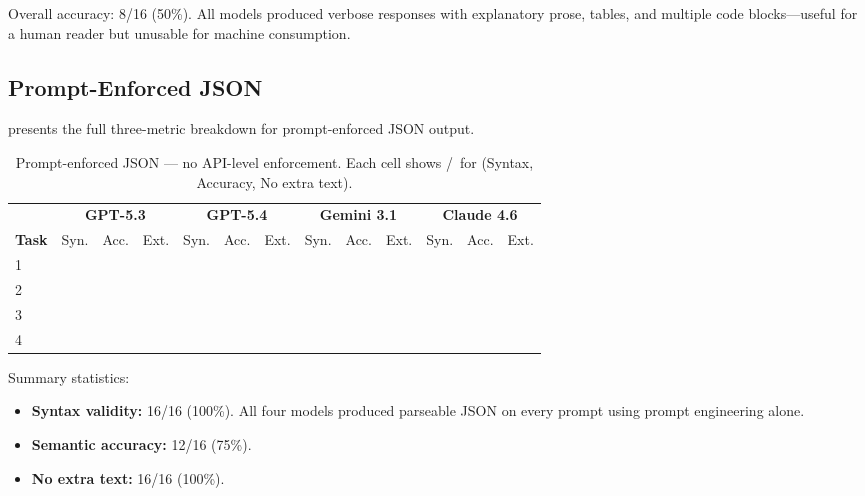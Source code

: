 \documentclass[11pt, letterpaper]{article}
\newcommand{\cmark}{\ding{51}}  %
\newcommand{\xmark}{\ding{55}}  %
\begin{document}
\noindent Overall accuracy: 8/16 (50\%). All models produced verbose responses with explanatory prose, tables, and multiple code blocks---useful for a human reader but unusable for machine consumption.

\subsection{Prompt-Enforced JSON}
\label{sec:prompt_results}

 presents the full three-metric breakdown for prompt-enforced JSON output.

\begin{table}[H]
\centering
\caption{Prompt-enforced JSON --- no API-level enforcement. Each cell shows \cmark/\xmark\ for (Syntax, Accuracy, No extra text).}
\label{tab:prompt_enforced}
\begin{tabular}{l*{4}{ccc}}
\toprule
 & \multicolumn{3}{c}{\textbf{GPT-5.3}} & \multicolumn{3}{c}{\textbf{GPT-5.4}} & \multicolumn{3}{c}{\textbf{Gemini 3.1}} & \multicolumn{3}{c}{\textbf{Claude 4.6}} \\
\cmidrule(lr){2-4} \cmidrule(lr){5-7} \cmidrule(lr){8-10} \cmidrule(lr){11-13}
\textbf{Task} & Syn. & Acc. & Ext. & Syn. & Acc. & Ext. & Syn. & Acc. & Ext. & Syn. & Acc. & Ext. \\
\midrule
1 & \cmark & \cmark & \cmark & \cmark & \cmark & \cmark & \cmark & \cmark & \cmark & \cmark & \xmark & \cmark \\
2 & \cmark & \xmark & \cmark & \cmark & \cmark & \cmark & \cmark & \xmark & \cmark & \cmark & \xmark & \cmark \\
3 & \cmark & \cmark & \cmark & \cmark & \cmark & \cmark & \cmark & \cmark & \cmark & \cmark & \cmark & \cmark \\
4 & \cmark & \cmark & \cmark & \cmark & \xmark & \cmark & \cmark & \cmark & \cmark & \cmark & \cmark & \cmark \\
\bottomrule
\end{tabular}
\end{table}

\noindent Summary statistics:
\begin{itemize}[leftmargin=*]
    \item \textbf{Syntax validity:} 16/16 (100\%). All four models produced parseable JSON on every prompt using prompt engineering alone.
    \item \textbf{Semantic accuracy:} 12/16 (75\%).
    \item \textbf{No extra text:} 16/16 (100\%).
\end{itemize}
\end{document}
